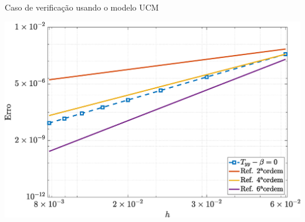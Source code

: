 \begin{frame}{Caso de verificação usando o modelo UCM}
\begin{minipage}{0.325\textwidth}
        \label{ucm_txy_Case11}
    \end{minipage}
    \hfill
    \begin{minipage}{0.325\textwidth}
        \centering
        \includegraphics[width=\textwidth]{Figures/UCM/NormErr_2nd_Re_100_Wi_1_epsilon_0_xi_0_alphaG_0_Dt_1e-06_at_0.05_tipsim_1_MMS_12_Tyy.eps}
        \label{ucm_tyy_Case11}
    \end{minipage}
\end{frame}

